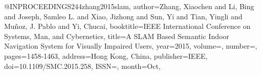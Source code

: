 @INPROCEEDINGS{244zhang2015slam,
author={Zhang, Xiaochen and Li, Bing and Joseph, Samleo L. and Xiao, Jizhong and Sun, Yi and Tian, Yingli and Muñoz, J. Pablo and Yi, Chucai},
booktitle={IEEE International Conference on Systems, Man, and Cybernetics}, 
title={A SLAM Based Semantic Indoor Navigation System for Visually Impaired Users}, 
year={2015},
volume={},
number={},
pages={1458-1463},
address={Hong Kong, China},
publisher={IEEE},
doi={10.1109/SMC.2015.258},
ISSN={},
month={Oct},}